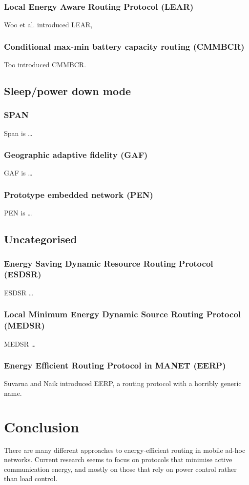 \documentclass[conference]{IEEEtran}
\begin{document}
\subsubsection{Local Energy Aware Routing Protocol (LEAR)}
Woo et al. introduced LEAR\cite{woo2001non},

\subsubsection{Conditional max-min battery capacity routing (CMMBCR)}
Too introduced CMMBCR\cite{toh2001maximum}.

\subsection{Sleep/power­ down mode}
\subsubsection{SPAN}
Span\cite{chen2002span} is \ldots

\subsubsection{Geographic adaptive fidelity (GAF)}
GAF\cite{xu2001geography} is \ldots{}

\subsubsection{Prototype embedded network (PEN)}
PEN\cite{girling2000design} is \ldots

\subsection{Uncategorised}

\subsubsection{Energy Saving Dynamic Resource Routing Protocol (ESDSR)}
ESDSR\cite{tarique2005energy} \ldots
\subsubsection{Local Minimum Energy Dynamic Source Routing Protocol (MEDSR)}
MEDSR\cite{tanque2007minimum} \ldots

\subsubsection{Energy Efficient Routing Protocol in MANET (EERP)}
Suvarna and Naik introduced EERP, a routing protocol with a horribly
generic name\cite{main2}.

\section{Conclusion}
There are many different approaches to energy-efficient routing in
mobile ad-hoc networks. Current research seems to focus on protocols
that minimise active communication energy, and mostly on those that
rely on power control rather than load control.




\end{document}
